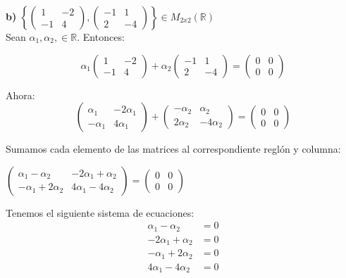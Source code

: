 \documentclass[letterpaper]{article}
\renewcommand{\*}{\cdot}
\theoremstyle{definition}
\begin{document}
\textbf{b)} $\left \lbrace \begin{pmatrix} 1 & -2 \\ -1 & 4 \end{pmatrix} ,\begin{pmatrix} -1 & 1 \\ 2 & -4 \end{pmatrix}  \right \rbrace \in M_{2x2}(\mathbb{R})$\\

Sean $\alpha _1, \alpha _2, \in \mathbb{R}$. Entonces:

$$\alpha_1 \begin{pmatrix} 1 & -2 \\ -1 & 4 \end{pmatrix}  + \alpha_2 \begin{pmatrix} -1 & 1 \\ 2 & -4 \end{pmatrix} = \begin{pmatrix}
0 & 0 \\ 0 & 0 \end{pmatrix}$$

Ahora:
$$\begin{pmatrix} \alpha_1 & -2\alpha_{1} \\ -\alpha_{1} & 4\alpha_{1} \end{pmatrix} +
\begin{pmatrix} -\alpha_{2} & \alpha_2 \\ 2\alpha_{2} & -4\alpha_{2} \end{pmatrix} = \begin{pmatrix} 	0 & 0 \\ 0 & 0 \end{pmatrix}$$

Sumamos cada elemento de las matrices al correspondiente reglón y columna:\\

\begin{center}
	$\begin{pmatrix}
	\alpha_{1}-\alpha_{2} & -2\alpha_{1}+\alpha_{2} \\ -\alpha_{1}+2\alpha_{2} & 4\alpha_{1}-4\alpha_{2}
	\end{pmatrix} = \begin{pmatrix}
	0 & 0 \\ 0 & 0
	\end{pmatrix}$
\end{center}

Tenemos el siguiente sistema de ecuaciones:
	\begin{align*}
	\alpha_{1}-\alpha_{2} &= 0\\
	-2\alpha_{1} + \alpha_{2} &= 0\\
	-\alpha_{1}+2\alpha_{2}&= 0\\
	4\alpha_{1}-4\alpha_{2}&= 0
	\end{align*}
\end{document}
